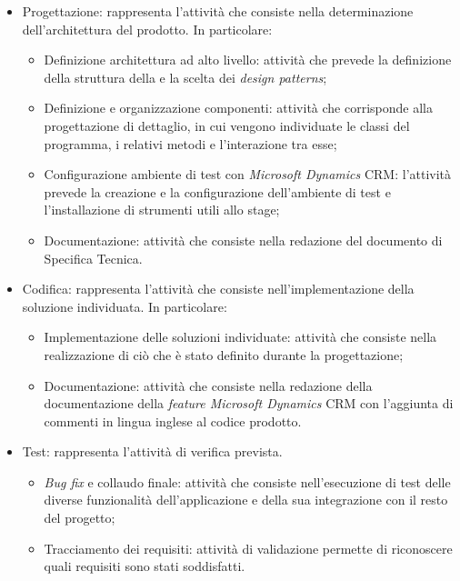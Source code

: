 \begin{itemize}
    \item Progettazione: rappresenta l'attività che consiste nella determinazione dell’architettura del prodotto. 
    In particolare:
        \begin{itemize}
            \item Definizione architettura ad alto livello: attività che prevede la definizione della struttura della e la scelta dei \emph{design patterns};
            \item Definizione e organizzazione componenti: attività che corrisponde alla progettazione di dettaglio, in cui vengono individuate le classi del programma, i relativi metodi e l'interazione tra esse;
               \item Configurazione ambiente di test con \emph{Microsoft Dynamics} CRM: l'attività prevede la creazione e la configurazione dell'ambiente di test e l'installazione di strumenti utili allo stage;
            \item Documentazione: attività che consiste nella redazione del documento di Specifica Tecnica.
        \end{itemize}
    \item Codifica: rappresenta l'attività che consiste nell'implementazione della soluzione individuata. In particolare:
        \begin{itemize}
            \item Implementazione delle soluzioni individuate: attività che consiste nella realizzazione di ciò che è stato definito durante la progettazione;
            \item Documentazione: attività che consiste nella redazione della documentazione della \emph{feature Microsoft Dynamics} CRM
            con l’aggiunta di commenti in lingua inglese al codice prodotto.
        \end{itemize}
                        \clearpage
    \item Test: rappresenta l'attività di verifica prevista.
        \begin{itemize}
            \item \emph{Bug fix} e collaudo finale: attività che consiste nell'esecuzione di test delle diverse funzionalità dell'applicazione e della sua integrazione con il resto del progetto;
            \item Tracciamento dei requisiti: attività di validazione  permette di riconoscere quali requisiti sono stati soddisfatti.
        \end{itemize}
\end{itemize}

